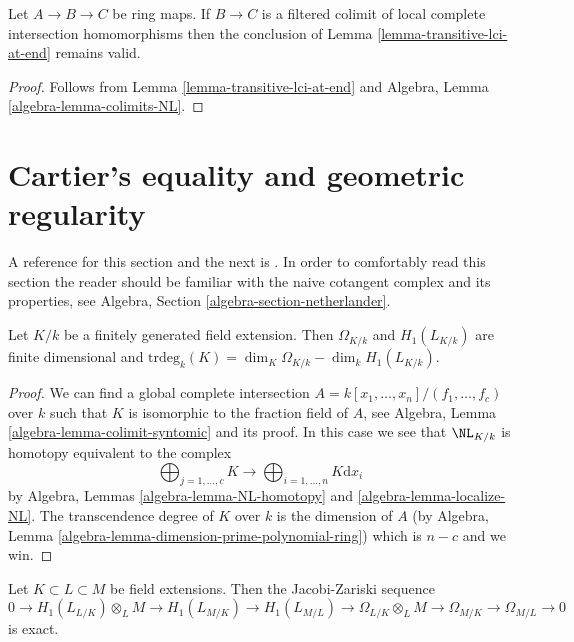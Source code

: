 \begin{lemma}
\label{lemma-transitive-colimit-lci-at-end}
Let $A \to B \to C$ be ring maps.
If $B \to C$ is a filtered colimit of local complete intersection
homomorphisms then the conclusion of
Lemma \ref{lemma-transitive-lci-at-end}
remains valid.
\end{lemma}

\begin{proof}
Follows from
Lemma \ref{lemma-transitive-lci-at-end}
and
Algebra, Lemma \ref{algebra-lemma-colimits-NL}.
\end{proof}








\section{Cartier's equality and geometric regularity}
\label{section-cartier-equality}

\noindent
A reference for this section and the next is \cite[Section 39]{MatCA}.
In order to comfortably read this section the reader should be
familiar with the naive cotangent complex and its properties, see
Algebra, Section \ref{algebra-section-netherlander}.

\begin{lemma}
\label{lemma-cartier-equality}
Let $K/k$ be a finitely generated field extension.
Then $\Omega_{K/k}$ and $H_1(L_{K/k})$ are finite dimensional and
$\text{trdeg}_k(K) = \dim_K \Omega_{K/k} - \dim_k H_1(L_{K/k})$.
\end{lemma}

\begin{proof}
We can find a global complete intersection
$A = k[x_1, \ldots, x_n]/(f_1, \ldots, f_c)$
over $k$ such that
$K$ is isomorphic to the fraction field of $A$, see
Algebra, Lemma \ref{algebra-lemma-colimit-syntomic}
and its proof. In this case we see that $\NL_{K/k}$ is homotopy
equivalent to the complex
$$
\bigoplus\nolimits_{j = 1, \ldots, c} K \longrightarrow
\bigoplus\nolimits_{i = 1, \ldots, n} K\text{d}x_i
$$
by Algebra, Lemmas \ref{algebra-lemma-NL-homotopy} and
\ref{algebra-lemma-localize-NL}.
The transcendence degree of $K$ over $k$ is the dimension of $A$
(by Algebra, Lemma \ref{algebra-lemma-dimension-prime-polynomial-ring})
which is $n - c$ and we win.
\end{proof}

\begin{lemma}
\label{lemma-transitivity-gamma}
Let $K \subset L \subset M$ be field extensions. Then the Jacobi-Zariski
sequence
$$
0 \to H_1(L_{L/K}) \otimes_L M \to
H_1(L_{M/K}) \to
H_1(L_{M/L}) \to
\Omega_{L/K} \otimes_L M \to
\Omega_{M/K} \to
\Omega_{M/L} \to 0
$$
is exact.
\end{lemma}

